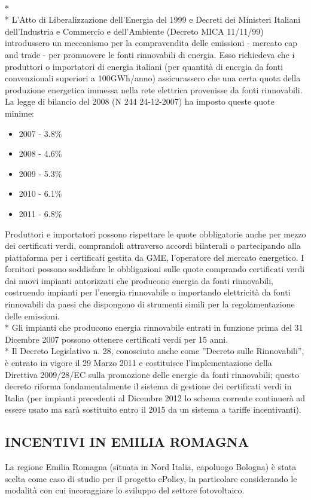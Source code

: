 \documentclass[12pt,a4paper,openright,twoside]{report}
\begin{document}
\\*\\*
L'Atto di Liberalizzazione dell'Energia del 1999 e Decreti dei Ministeri Italiani dell'Industria e Commercio e dell'Ambiente (Decreto MICA 11/11/99) introdussero un meccanismo per la compravendita delle emissioni - mercato cap and trade - per promuovere le fonti rinnovabili di energia. Esso richiedeva che i produttori o importatori di energia italiani (per quantità di energia da fonti convenzionali superiori a 100GWh/anno) assicurassero che una certa quota della produzione energetica immessa nella rete elettrica provenisse da fonti rinnovabili. La legge di bilancio del 2008 (N 244 24-12-2007) ha imposto queste quote minime: 
\begin{itemize}
\item 2007 - 3.8\%
\item 2008 - 4.6\%
\item 2009 - 5.3\%
\item 2010 - 6.1\%
\item 2011 - 6.8\%
\end{itemize}
Produttori e importatori possono rispettare le quote obbligatorie anche per mezzo dei certificati verdi, comprandoli attraverso accordi bilaterali o partecipando alla piattaforma per i certificati gestita da GME, l'operatore del mercato energetico. I fornitori possono soddisfare le obbligazioni sulle quote comprando certificati verdi dai nuovi impianti autorizzati che producono energia da fonti rinnovabili, costruendo impianti per l'energia rinnovabile o importando elettricità da fonti rinnovabili da paesi che dispongono di strumenti simili per la regolamentazione delle emissioni.\\*
Gli impianti che producono energia rinnovabile entrati in funzione prima del 31 Dicembre 2007 possono ottenere certificati verdi per 15 anni.\\*
Il Decreto Legislativo n. 28, conosciuto anche come ''Decreto sulle Rinnovabili'', è entrato in vigore il 29 Marzo 2011 e costituisce l'implementazione della Direttiva 2009/28/EC sulla promozione delle energie da fonti rinnovabili; questo decreto riforma fondamentalmente il sistema di gestione dei certificati verdi in Italia (per impianti precedenti al Dicembre 2012 lo schema corrente continuerà ad essere usato ma sarà sostituito entro il 2015 da un sistema a tariffe incentivanti).

\subsection[INCENTIVI REGIONALI]{\nohyphens{INCENTIVI IN EMILIA ROMAGNA}}
La regione Emilia Romagna (situata in Nord Italia, capoluogo Bologna) è stata scelta come caso di studio per il progetto ePolicy, in particolare considerando le modalità con cui incoraggiare lo sviluppo del settore fotovoltaico. 
\end{document}
